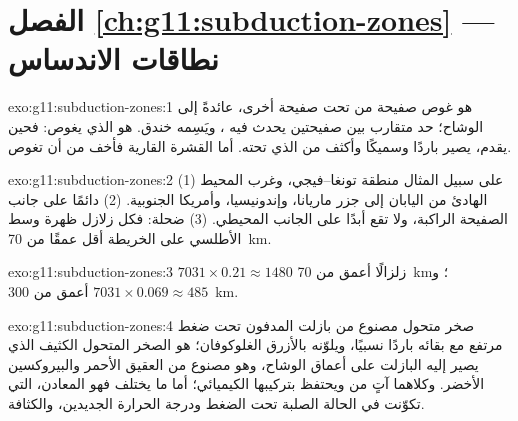 \section*{الفصل \ref{ch:g11:subduction-zones} --- نطاقات الاندساس}

\begin{solution}{exo:g11:subduction-zones:1}
 هو غوص صفيحة من  تحت صفيحة
أخرى، عائدةً إلى الوشاح؛  حد متقارب بين صفيحتين
يحدث فيه ، ويَسِمه خندق.  هو الذي يغوص: فحين
يقدم، يصير باردًا وسميكًا وأكثف من  الذي تحته. أما
القشرة القارية فأخف من أن تغوص.
\end{solution}

\begin{solution}{exo:g11:subduction-zones:2}
(1) على سبيل المثال منطقة تونغا--فيجي، وغرب المحيط الهادئ من اليابان إلى
جزر ماريانا، وإندونيسيا، وأمريكا الجنوبية. (2) دائمًا على جانب
الصفيحة الراكبة، ولا تقع أبدًا على الجانب المحيطي. (3) ضحلة: فكل زلازل
ظهرة وسط الأطلسي على الخريطة أقل عمقًا من \qty{70}{km}.
\end{solution}

\begin{solution}{exo:g11:subduction-zones:3}
$7031 \times 0.21 \approx 1480$ زلزالًا أعمق من \qty{70}{km}؛
و$7031 \times 0.069 \approx 485$ أعمق من \qty{300}{km}.
\end{solution}

\begin{solution}{exo:g11:subduction-zones:4}
 صخر متحول مصنوع من بازلت 
المدفون تحت ضغط مرتفع مع بقائه باردًا نسبيًا، ويلوّنه بالأزرق
الغلوكوفان؛  هو الصخر المتحول الكثيف الذي يصير إليه البازلت 
على أعماق الوشاح، وهو مصنوع من العقيق الأحمر والبيروكسين الأخضر. وكلاهما آتٍ من
 ويحتفظ بتركيبها الكيميائي؛ أما ما يختلف فهو
المعادن، التي تكوّنت في الحالة الصلبة تحت الضغط ودرجة الحرارة الجديدين،
والكثافة.
\end{solution}

